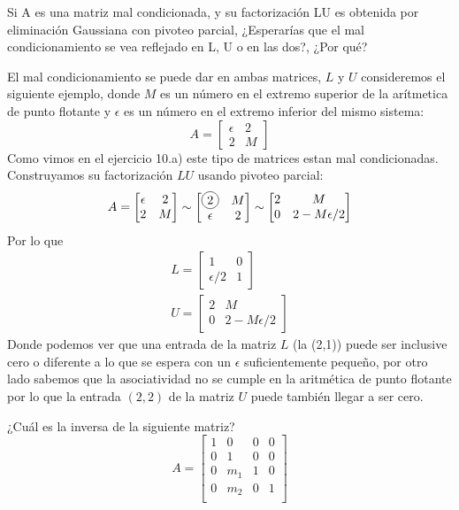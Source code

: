 \documentclass[paper=letter, fontsize=11pt]{scrartcl}
\numberwithin{equation}{section} %
\numberwithin{figure}{section} %
\numberwithin{table}{section} %
\newcommand\Circle[1]{%
  \tikz[baseline=(char.base)]\node[circle,draw,inner sep=2pt] (char) {#1};}
\newenvironment{cframed}[1][blue]
  {\begin{tcolorbox}[colframe=#1,colback=white]}
  {\end{tcolorbox}}
\begin{document}
\begin{enumerate}
\begin{cframed}[violet]
\item Si A es una matriz mal condicionada, y su factorización LU es obtenida por eliminación Gaussiana con pivoteo parcial, ¿Esperarías que el mal condicionamiento se vea reflejado en L, U o en las dos?, ¿Por qué?
\end{cframed}

El mal condicionamiento se puede dar en ambas matrices, $L$ y $U$ consideremos el siguiente ejemplo, donde $M$ es un número en el extremo superior de la arítmetica de punto flotante y $\epsilon$ es un número en el extremo inferior del mismo sistema:
\[
A = \begin{bmatrix}
\epsilon & 2\\
2 & M
\end{bmatrix} 
\]
Como vimos en el ejercicio 10.a) este tipo de matrices estan mal condicionadas. Construyamos su factorización $LU$ usando pivoteo parcial:
\[
A = \begin{bmatrix}
\epsilon & 2\\
2 & M
\end{bmatrix} \sim
\begin{bmatrix}
  \Circle{2} & M\\
\epsilon & 2
\end{bmatrix} \sim 
\begin{bmatrix}
  2 & M\\
0 & 2-M\epsilon/2
\end{bmatrix}
\]
Por lo que 
\[
\begin{split}
L = \begin{bmatrix}
1 & 0\\
\epsilon/2 & 1
\end{bmatrix}\\
U =\begin{bmatrix}
  2 & M\\
0 & 2-M\epsilon/2
\end{bmatrix}
\end{split}
\]
Donde podemos ver que una entrada de la matriz $L$ (la (2,1)) puede ser inclusive cero o diferente a lo que se espera con un $\epsilon$ suficientemente pequeño, por otro lado sabemos que la asociatividad no se cumple en la aritmética de punto flotante por lo que la entrada $(2,2)$ de la matriz $U$ puede también llegar a ser cero.






\begin{cframed}[teal]
\item 
\begin{enumerate}
¿Cuál es la inversa de la siguiente matriz?
\[
A = \begin{bmatrix}
1 & 0& 0 & 0   \\
0 & 1& 0& 0\\
0 & m_1 & 1 & 0 \\
0& m_2 & 0 & 1\\
\end{bmatrix}
\]




\end{enumerate}
\end{cframed}
\end{enumerate}
\end{document}
